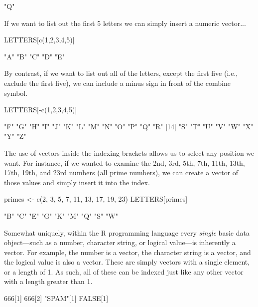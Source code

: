 \begin{outR}
[1] "Q"
\end{outR}

\noindent
If we want to list out the first 5 letters we can simply insert a numeric vector...
\begin{inR}
LETTERS[c(1,2,3,4,5)]
\end{inR}

\begin{outR}
[1] "A" "B" "C" "D" "E"
\end{outR}

\noindent
By contrast, if we want to list out all of the letters, except the first five (i.e., exclude the first five), we can include a minus sign in front of the combine symbol.

\begin{inR}
LETTERS[-c(1,2,3,4,5)]
\end{inR}

\begin{outR}
[1] "F" "G" "H" "I" "J" "K" "L" "M" "N" "O" "P" "Q" "R"
[14] "S" "T" "U" "V" "W" "X" "Y" "Z"
\end{outR}

\noindent
The use of vectors inside the indexing brackets allows us to select any position we want.  For instance, if we wanted to examine the 2nd, 3rd, 5th, 7th, 11th, 13th, 17th, 19th, and 23rd numbers (all prime numbers), we can create a vector of those values and simply insert it into the index. 

\begin{inR}
primes <- c(2, 3, 5, 7, 11, 13, 17, 19, 23)
LETTERS[primes]
\end{inR}

\begin{outR}
[1] "B" "C" "E" "G" "K" "M" "Q" "S" "W"
\end{outR}

Somewhat uniquely, within the R programming language every \textit{single} basic data object—such as a number, character string, or logical value—is inherently a vector. For example, the number  is a vector, the character string  is a vector, and the logical value  is also a vector. These are simply vectors with a single element, or a length of 1. As such, all of these can be indexed just like any other vector with a length greater than 1.

\begin{inR}
666[1]
666[2]
"SPAM"[1]
FALSE[1]
\end{inR}

